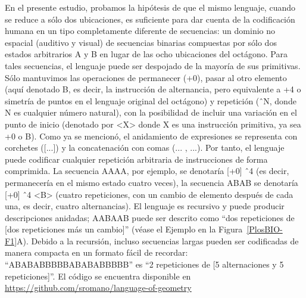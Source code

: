 En el presente estudio, probamos la hipótesis de que el mismo lenguaje, cuando se reduce a sólo dos ubicaciones, es suficiente para dar cuenta de la codificación humana en un tipo completamente diferente de secuencias: un dominio no espacial (auditivo y visual) de secuencias binarias compuestas por sólo dos estados arbitrarios A y B en lugar de las ocho ubicaciones del octágono. Para tales secuencias, el lenguaje puede ser despojado de la mayoría de sus primitivas. Sólo mantuvimos las operaciones de permanecer (+0), pasar al otro elemento (aquí denotado B, es decir, la instrucción de alternancia, pero equivalente a +4 o simetría de puntos en el lenguaje original del octágono) y repetición (\^ \ N, donde N es cualquier número natural), con la posibilidad de incluir una variación en el punto de inicio (denotado por <X> donde X es una instrucción primitiva, ya sea +0 o B). Como ya se mencionó, el anidamiento de expresiones se representa con corchetes ([...]) y la concatenación con comas (... , ...). Por tanto, el lenguaje puede codificar cualquier repetición arbitraria de instrucciones de forma comprimida. La secuencia AAAA, por ejemplo, se denotaría [+0] \^ \ 4 (es decir, permanecería en el mismo estado cuatro veces), la secuencia ABAB se denotaría [+0] \^ \ 4 <B> (cuatro repeticiones, con un cambio de elemento después de cada una, es decir, cuatro alternancias). El lenguaje es recursivo y puede producir descripciones anidadas; AABAAB puede ser descrito como ``dos repeticiones de [dos repeticiones más un cambio]'' (véase el Ejemplo en la Figura~\ref{PlosBIO-F1}A). Debido a la recursión, incluso secuencias largas pueden ser codificadas de manera compacta en un formato fácil de recordar: ``ABABABBBBBABABABBBBB'' es ``2 repeticiones de [5 alternaciones y 5 repeticiones]''. El código se encuentra disponible en \hyperref[https://github.com/sromano/language-of-geometry]{https://github.com/sromano/language-of-geometry}

